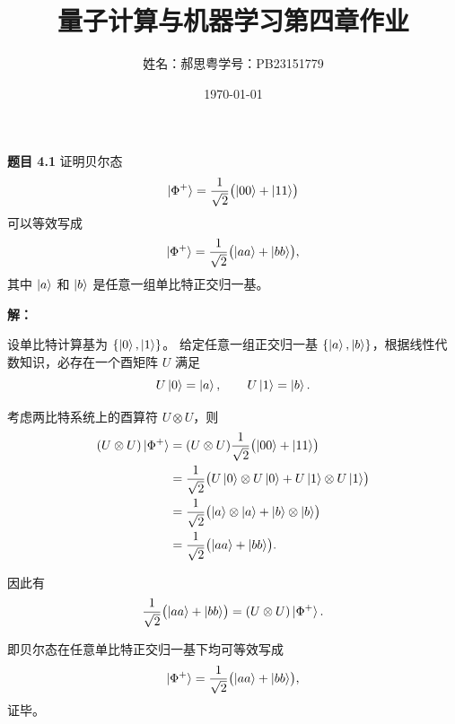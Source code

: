 \documentclass[12pt]{article}
\title{\textbf{量子计算与机器学习第四章作业}}
\author{姓名：郝思粤\quad 学号：PB23151779}
\date{\today}
\begin{document}
\maketitle

\textbf{题目 4.1}  
证明贝尔态
\[
\ket{\Phi^+}=\frac{1}{\sqrt{2}}\bigl(\ket{00}+\ket{11}\bigr)
\]
可以等效写成
\[
\ket{\Phi^+}=\frac{1}{\sqrt{2}}\bigl(\ket{aa}+\ket{bb}\bigr),
\]
其中 $\ket{a}$ 和 $\ket{b}$ 是任意一组单比特正交归一基。

\bigskip

\textbf{解：}

设单比特计算基为 $\{\ket{0},\ket{1}\}$。  
给定任意一组正交归一基 $\{\ket{a},\ket{b}\}$，根据线性代数知识，必存在一个酉矩阵 $U$ 满足
\[
U\ket{0}=\ket{a},\qquad U\ket{1}=\ket{b}.
\]

考虑两比特系统上的酉算符 $U\otimes U$，则
\begin{align}
(U\otimes U)\ket{\Phi^+}
&=(U\otimes U)\frac{1}{\sqrt{2}}\bigl(\ket{00}+\ket{11}\bigr) \\
&=\frac{1}{\sqrt{2}}\bigl(U\ket{0}\otimes U\ket{0}
  +U\ket{1}\otimes U\ket{1}\bigr) \\
&=\frac{1}{\sqrt{2}}\bigl(\ket{a}\otimes\ket{a}
  +\ket{b}\otimes\ket{b}\bigr) \\
&=\frac{1}{\sqrt{2}}\bigl(\ket{aa}+\ket{bb}\bigr).
\end{align}

因此有
\[
\frac{1}{\sqrt{2}}\bigl(\ket{aa}+\ket{bb}\bigr)
= (U\otimes U)\ket{\Phi^+}.
\]

即贝尔态在任意单比特正交归一基下均可等效写成
\[
\ket{\Phi^+}=\frac{1}{\sqrt{2}}\bigl(\ket{aa}+\ket{bb}\bigr),
\]
证毕。
\end{document}
